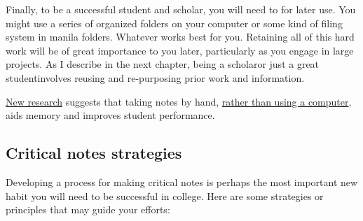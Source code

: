 Finally, to be a successful student and scholar, you will need to \hyperlink{joyofreuse}{\color{Ahrenge}{create a system for organizing and retaining these annotations and notes}} for later use. You might use a series of organized folders on your computer or some kind of filing system in manila folders. Whatever works best for you. Retaining all of this hard work will be of great importance to you later, particularly as you engage in large \hyperlink{academicresearch}{\color{Ahrenge}{research}} projects. As I describe in the next chapter, being a scholar\textemdash or just a great student\textemdash involves reusing and re-purposing prior work and information. 
 
\smallskip

\begin{center}
\begin{tcolorbox}[colframe=oyster, coltitle=black, sharp corners, title=\ding{52} Note]

\href{https://sites.udel.edu/victorp/files/2010/11/Psychological-Science-2014-Mueller-0956797614524581-1u0h0yu.pdf}{New research} suggests that taking notes by hand, \href{https://www.scientificamerican.com/article/a-learning-secret-don-t-take-notes-with-a-laptop/}{rather than using a computer}, aids memory and improves student performance.

\end{tcolorbox}
\end{center}


\subsection{Critical notes strategies}

Developing a process for making critical notes is perhaps the most important new
habit you will need to be successful in college. Here are some strategies or
principles that may guide your efforts:

